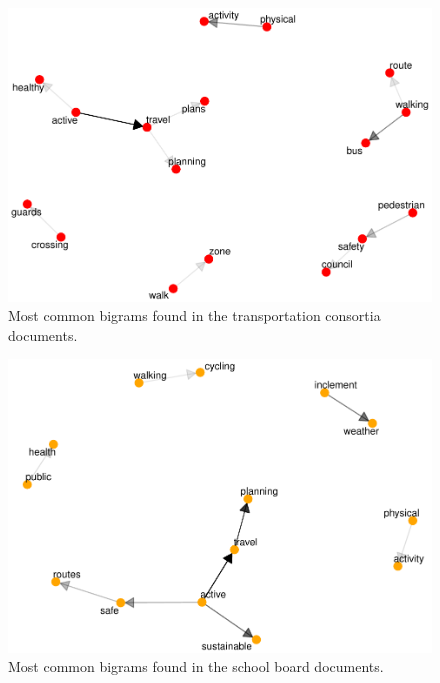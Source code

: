 \documentclass[]{elsarticle} %
\begin{document}
\begin{figure}

{\centering \includegraphics[width=1\linewidth]{AST-Framing-Ontario_files/figure-latex/consortia-visual-1} 

}

\caption{\label{fig:consortia-visual}Most common bigrams found in the transportation consortia documents.}\label{fig:consortia-visual}
\end{figure}

\begin{figure}

{\centering \includegraphics[width=1\linewidth]{AST-Framing-Ontario_files/figure-latex/school-visual-1} 

}

\caption{\label{fig:school-visual}Most common bigrams found in the school board documents.}\label{fig:school-visual}
\end{figure}
\end{document}
